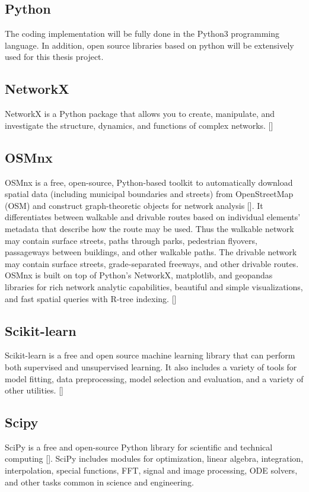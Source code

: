 \subsection{Python}
The coding implementation will be fully done in the Python3 programming language. In addition, open source libraries based on python will be extensively used for this thesis project.

\subsection{NetworkX}
NetworkX is a Python package that allows you to create, manipulate, and investigate the structure, dynamics, and functions of complex networks. [\cite{Hagberg:2008}]

\subsection{OSMnx}
OSMnx is a free, open-source, Python-based toolkit to automatically download spatial data (including municipal boundaries and streets) from OpenStreetMap (OSM) and construct graph-theoretic objects for network analysis [\cite{Boeing:2017}]. It differentiates between walkable and drivable routes based on individual elements’ metadata that describe how the route may be used. Thus the walkable network may contain surface streets, paths through parks, pedestrian flyovers, passageways between buildings, and other walkable paths. The drivable network may contain surface streets, grade-separated freeways, and other drivable routes. OSMnx is built on top of Python's NetworkX, matplotlib, and geopandas libraries for rich network analytic capabilities, beautiful and simple visualizations, and fast spatial queries with R-tree indexing. [\cite{Boeing:2017}]

\subsection{Scikit-learn}
Scikit-learn is a free and open source machine learning library that can perform both supervised and unsupervised learning. It also includes a variety of tools for model fitting, data preprocessing, model selection and evaluation, and a variety of other utilities. [\cite{scikit-learn}]

\subsection{Scipy}
SciPy is a free and open-source Python library for scientific and technical computing [\cite{Virtanen:2020}]. SciPy includes modules for optimization, linear algebra, integration, interpolation, special functions, FFT, signal and image processing, ODE solvers, and other tasks common in science and engineering.

